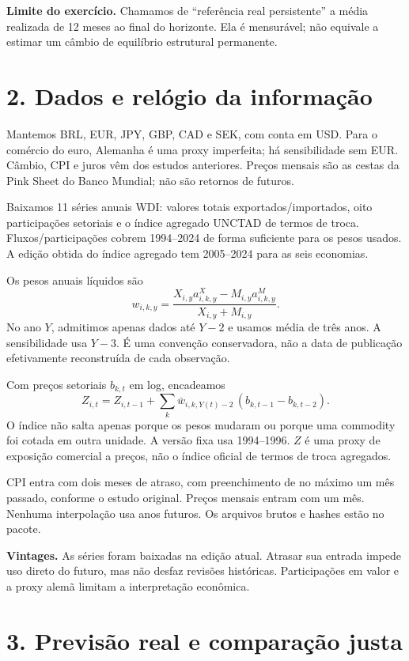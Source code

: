\documentclass[11pt,a4paper]{article}
\begin{document}
\textbf{Limite do exercício.} Chamamos de ``referência real persistente'' a média realizada de 12 meses ao final do horizonte. Ela é mensurável; não equivale a estimar um câmbio de equilíbrio estrutural permanente.

\clearpage
\section*{2. Dados e relógio da informação}

Mantemos BRL, EUR, JPY, GBP, CAD e SEK, com conta em USD. Para o comércio do euro, Alemanha é uma proxy imperfeita; há sensibilidade sem EUR. Câmbio, CPI e juros vêm dos estudos anteriores. Preços mensais são as cestas da Pink Sheet do Banco Mundial; não são retornos de futuros.

Baixamos 11 séries anuais WDI: valores totais exportados/importados, oito participações setoriais e o índice agregado UNCTAD de termos de troca. Fluxos/participações cobrem 1994--2024 de forma suficiente para os pesos usados. A edição obtida do índice agregado tem 2005--2024 para as seis economias.

Os pesos anuais líquidos são
\[
w_{i,k,y}=\frac{X_{i,y}a^X_{i,k,y}-M_{i,y}a^M_{i,k,y}}{X_{i,y}+M_{i,y}}.
\]
No ano $Y$, admitimos apenas dados até $Y-2$ e usamos média de três anos. A sensibilidade usa $Y-3$. É uma convenção conservadora, não a data de publicação efetivamente reconstruída de cada observação.

Com preços setoriais $b_{k,t}$ em log, encadeamos
\[
Z_{i,t}=Z_{i,t-1}+\sum_k \bar w_{i,k,Y(t)-2}\,(b_{k,t-1}-b_{k,t-2}).
\]
O índice não salta apenas porque os pesos mudaram ou porque uma commodity foi cotada em outra unidade. A versão fixa usa 1994--1996. $Z$ é uma proxy de exposição comercial a preços, não o índice oficial de termos de troca agregados.

CPI entra com dois meses de atraso, com preenchimento de no máximo um mês passado, conforme o estudo original. Preços mensais entram com um mês. Nenhuma interpolação usa anos futuros. Os arquivos brutos e hashes estão no pacote.

\textbf{Vintages.} As séries foram baixadas na edição atual. Atrasar sua entrada impede uso direto do futuro, mas não desfaz revisões históricas. Participações em valor e a proxy alemã limitam a interpretação econômica.

\clearpage
\section*{3. Previsão real e comparação justa}
\end{document}
